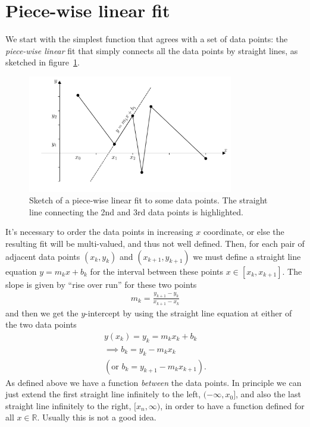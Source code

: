 \section{Piece-wise linear fit}
We start with the simplest function that agrees with a set of data points: the \textit{piece-wise linear} fit that simply connects all the data points by straight lines, as sketched in figure~\ref{fig:ch3_piecewise}.
\begin{figure}[H]
	\begin{center}
	\includegraphics[width=0.8\textwidth]{figures/ch3_piecewise.pdf} 
	  \caption{Sketch of a piece-wise linear fit to some data points. The straight line connecting the 2nd and 3rd data points is highlighted.} \label{fig:ch3_piecewise}
	\end{center}
\end{figure}
It's necessary to order the data points in increasing $x$ coordinate, or else the resulting fit will be multi-valued, and thus not well defined. Then, for each pair of adjacent data points $(x_k,y_k)$ and $(x_{k+1},y_{k+1})$ we must define a straight line equation $y = m_k x + b_k$ for the interval between these points $x\in [x_k,x_{k+1}]$. The slope is given by ``rise over run'' for these two points
\begin{align*}
\boxed{ m_k = \frac{ y_{k+1}-y_{k} }{ x_{k+1}-x_{k} } }
\end{align*}
and then we get the $y$-intercept by using the straight line equation at either of the two data points
\begin{align*}
y(x_k) = y_k = m_k x_k + b_k \\
\implies \boxed{ b_k = y_k - m_k x_k} \\
(\text{or } b_k = y_{k+1} - m_k x_{k+1}).
\end{align*}
As defined above we have a function \textit{between} the data points. In principle we can just extend the first straight line infinitely to the left, $(-\infty,x_0]$, and also the last straight line infinitely to the right, $[x_n,\infty)$, in order to have a function defined for all $x\in \mathbb{R}$. Usually this is not a good idea.

